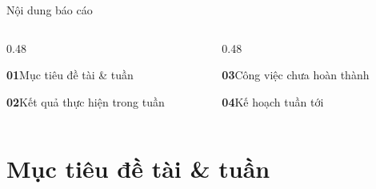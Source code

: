 \documentclass[aspectratio=169, 10pt, xcolor={table}]{beamer}
\begin{document}
\begin{frame}{Nội dung báo cáo}
    \vspace{0.2cm}
    \begin{columns}[T]
        \begin{column}{0.48\textwidth}
            \begin{softcard}\textbf{\color{brand}01}\quad Mục tiêu đề tài \& tuần\end{softcard}
            \begin{softcard}\textbf{\color{brand}02}\quad Kết quả thực hiện trong tuần\end{softcard}
        \end{column}
        \begin{column}{0.48\textwidth}
            \begin{softcard}\textbf{\color{brand}03}\quad Công việc chưa hoàn thành\end{softcard}
            \begin{softcard}\textbf{\color{brand}04}\quad Kế hoạch tuần tới\end{softcard}
        \end{column}
    \end{columns}
\end{frame}

\section{Mục tiêu đề tài \& tuần}
\end{document}
